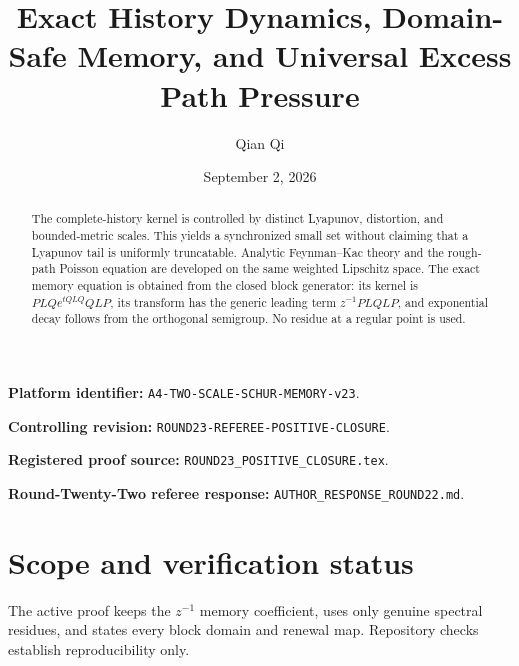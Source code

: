 \documentclass[11pt,reqno]{amsart}
\title[History, memory, and universal pressure]{Exact History Dynamics, Domain-Safe Memory, and Universal Excess Path Pressure}
\author{Qian Qi}
\date{September 2, 2026}
\theoremstyle{definition}
\theoremstyle{remark}
\begin{document}
\raggedbottom
\begin{abstract}
The complete-history kernel is controlled by distinct Lyapunov, distortion,
and bounded-metric scales. This yields a synchronized small set without
claiming that a Lyapunov tail is uniformly truncatable. Analytic
Feynman--Kac theory and the rough-path Poisson equation are developed on the
same weighted Lipschitz space. The exact memory equation is obtained from the
closed block generator: its kernel is
$PLQe^{tQLQ}QLP$, its transform has the generic leading term
$z^{-1}PLQLP$, and exponential decay follows from the orthogonal semigroup.
No residue at a regular point is used.
\end{abstract}
\maketitle
\noindent\textbf{Platform identifier:} \texttt{A4-TWO-SCALE-SCHUR-MEMORY-v23}.\par
\noindent\textbf{Controlling revision:} \texttt{ROUND23-REFEREE-POSITIVE-CLOSURE}.\par
\noindent\textbf{Registered proof source:} \texttt{ROUND23\_POSITIVE\_CLOSURE.tex}.\par
\noindent\textbf{Round-Twenty-Two referee response:} \texttt{AUTHOR\_RESPONSE\_ROUND22.md}.\par
\tableofcontents

\section*{Scope and verification status}
The active proof keeps the $z^{-1}$ memory coefficient, uses only genuine
spectral residues, and states every block domain and renewal map. Repository
checks establish reproducibility only.
\printbibliography
\end{document}
